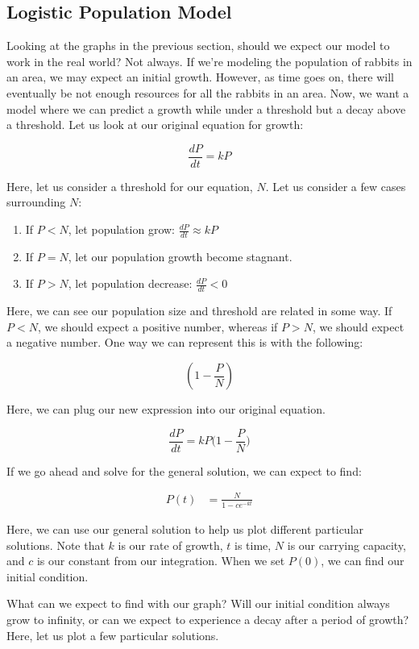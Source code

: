 \documentclass{amsart}
\theoremstyle{definition}
\numberwithin{equation}{section}
\begin{document}
\begin{sansmath}
\section{Logistic Population Model}

Looking at the graphs in the previous section, should we expect our model to work in the real world? Not always. If we're modeling the population of rabbits in an area, we may expect an initial growth. However, as time goes on, there will eventually be not enough resources for all the rabbits in an area. Now, we want a model where we can predict a growth while under a threshold but a decay above a threshold. Let us look at our original equation for growth:

\[ \frac{dP}{dt} = kP \]

Here, let us consider a threshold for our equation, $N$. Let us consider a few cases surrounding $N$:

\begin{enumerate}
  \item If $P < N$, let population grow: $\frac{dP}{dt} \approx kP$
  \item If $P = N$, let our population growth become stagnant.
  \item If $P > N$, let population decrease: $\frac{dP}{dt} < 0$
\end{enumerate}

Here, we can see our population size and threshold are related in some way. If $P < N$, we should expect a positive number, whereas if $P > N$, we should expect a negative number. One way we can represent this is with the following:

\[ (1 - \frac{P}{N} )\]

Here, we can plug our new expression into our original equation.

\[ \frac{dP}{dt} = kP \Big(1 - \frac{P}{N} \Big) \]

If we go ahead and solve for the general solution, we can expect to find:

\begin{align*}
  P(t) & = \frac{N}{1 - ce^{-kt}}
\end{align*}

Here, we can use our general solution to help us plot different particular solutions. Note that $k$ is our rate of growth, $t$ is time, $N$ is our carrying capacity, and $c$ is our constant from our integration. When we set $P(0)$, we can find our initial condition.

What can we expect to find with our graph? Will our initial condition always grow to infinity, or can we expect to experience a decay after a period of growth? Here, let us plot a few particular solutions. %


\end{sansmath}
\end{document}
